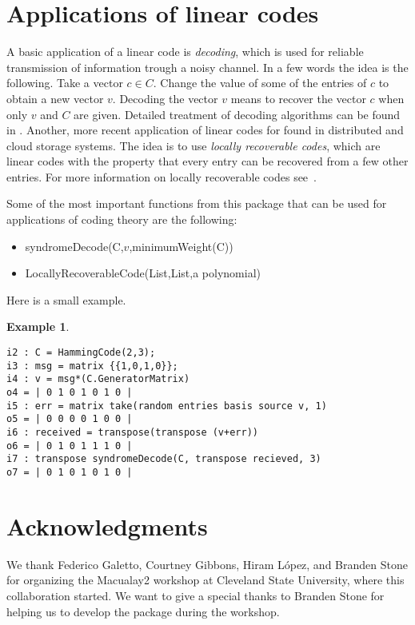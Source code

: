 \documentclass[12pt]{amsart}
\theoremstyle{plain}
\newtheorem{example}[theorem]{Example}
\begin{document}
\section{Applications of linear codes}
A basic application of a linear code is {\it decoding}, which is used for reliable transmission of information trough a noisy channel. In a few words the idea is the following. Take a vector $c\in C.$ Change the value of some of the entries of $c$ to obtain a new vector $v$. Decoding the vector $v$ means to recover the vector $c$ when only $v$ and $C$ are given. Detailed treatment of decoding algorithms can be found in \cite{huf-pless}. Another, more recent application of linear codes for found in distributed and cloud storage systems. The idea is to use {\it locally recoverable codes}, which are linear codes with the property that every entry can be recovered from a few other entries. For more information on locally recoverable codes see~\cite{TamoBarg}. 


Some of the most important functions from this package that can be used for applications of coding theory are the following:
\begin{itemize}
\item syndromeDecode(C,$v$,minimumWeight(C))
\item LocallyRecoverableCode(List,List,a polynomial)
\end{itemize}

Here is a small example. 

\begin{example}
$\,$
\begin{verbatim}
i2 : C = HammingCode(2,3);
i3 : msg = matrix {{1,0,1,0}};
i4 : v = msg*(C.GeneratorMatrix)
o4 = | 0 1 0 1 0 1 0 |
i5 : err = matrix take(random entries basis source v, 1)
o5 = | 0 0 0 0 1 0 0 |
i6 : received = transpose(transpose (v+err))
o6 = | 0 1 0 1 1 1 0 |
i7 : transpose syndromeDecode(C, transpose recieved, 3)
o7 = | 0 1 0 1 0 1 0 |
\end{verbatim}
\end{example}




\section*{Acknowledgments}
We thank Federico Galetto, Courtney Gibbons, Hiram L\'opez, and Branden Stone for organizing the Macualay2 workshop at Cleveland State University, where this collaboration started. We want to give a special thanks to Branden Stone for helping us to develop the package during the workshop.
\end{document}
